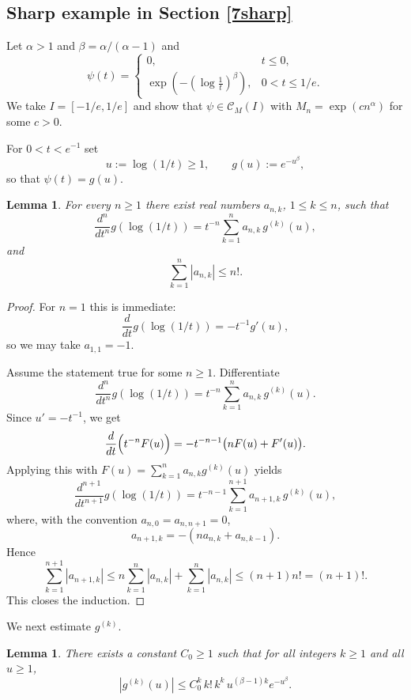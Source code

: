 \documentclass[11pt]{amsart}
\newtheorem{lemma}[theorem]{Lemma}
\newcommand{\1}{{\rm 1\hspace*{-0.4ex}%
			\rule{0.1ex}{1.52ex}\hspace*{0.2ex}}}
\numberwithin{equation}{section}
\begin{document}
\subsection{Sharp example in Section \ref{7sharp}}\label{sec9.2}
Let $\alpha>1$ and $\beta=\alpha/(\alpha-1)$ and 
\[\psi(t)=\begin{cases}
	0,& t\le 0,\\[1mm]
	\exp(-(\log\frac1{t})^{\beta}),& 0<t\le1/e.
\end{cases}\]
We take $I=[-1/e,1/e]$ and show that $\psi\in \mathcal{C}_M(I)$ with $M_n=\exp(c n^\alpha)$ for some $c>0$.

For $0<t<e^{-1}$ set
\[
u:=\log(1/t)\ge 1,
\qquad
g(u):=e^{-u^\beta},
\]
so that $\psi(t)=g(u)$.

\begin{lemma}
	\label{lem:dtdu}
	For every $n\ge 1$ there exist real numbers $a_{n,k}$, $1\le k\le n$, such that
	\[
	\frac{d^n}{dt^n}g(\log(1/t))
	=
	t^{-n}\sum_{k=1}^n a_{n,k}\,g^{(k)}(u),
	\]
	and
	\[
	\sum_{k=1}^n |a_{n,k}|\le n!.
	\]
\end{lemma}

\begin{proof}
	For $n=1$ this is immediate:
	\[
	\frac{d}{dt}g(\log(1/t))=-t^{-1}g'(u),
	\]
	so we may take $a_{1,1}=-1$.
	
	Assume the statement true for some $n\ge 1$.
	Differentiate
	\[
	\frac{d^n}{dt^n}g(\log(1/t))
	=
	t^{-n}\sum_{k=1}^n a_{n,k}\,g^{(k)}(u).
	\]
	Since $u'=-t^{-1}$, we get
	\[
	\frac{d}{dt}\Bigl(t^{-n}F(u)\Bigr)
	=
	-t^{-n-1}\bigl(nF(u)+F'(u)\bigr).
	\]
	Applying this with $F(u)=\sum_{k=1}^n a_{n,k}g^{(k)}(u)$ yields
	\[
	\frac{d^{n+1}}{dt^{n+1}}g(\log(1/t))
	=
	t^{-n-1}\sum_{k=1}^{n+1} a_{n+1,k}\,g^{(k)}(u),
	\]
	where, with the convention $a_{n,0}=a_{n,n+1}=0$,
	\[
	a_{n+1,k}=-(n a_{n,k}+a_{n,k-1}).
	\]
	Hence
	\[
	\sum_{k=1}^{n+1}|a_{n+1,k}|
	\le
	n\sum_{k=1}^n|a_{n,k}|+\sum_{k=1}^n|a_{n,k}|
	\le
	(n+1)n!=(n+1)!.
	\]
	This closes the induction.
\end{proof}

We next estimate $g^{(k)}$.

\begin{lemma}
	\label{lem:gk}
	There exists a constant $C_0\ge 1$ such that for all integers $k\ge 1$ and all $u\ge 1$,
	\[
	|g^{(k)}(u)|
	\le
	C_0^k\,k!\,k^k\,u^{(\beta-1)k}e^{-u^\beta}.
	\]
\end{lemma}
\end{document}
